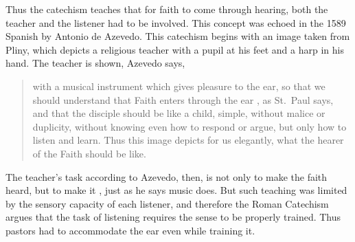 Thus the catechism teaches that for faith to come through hearing, both the 
teacher and the listener had to be involved.
This concept was echoed in the 1589 Spanish  by Antonio de Azevedo.%
  \Autocite{Azevedo:Catecismo}
This catechism begins with an image taken from Pliny, which depicts a religious 
teacher with a pupil at his feet and a harp in his hand.
The teacher is shown, Azevedo says,
\begin{quote}
    with a musical instrument which gives pleasure to the ear, so that we 
    should understand that Faith enters through the ear , as 
    St.\ Paul says, and that the disciple should be like a child, simple, without 
    malice or duplicity, without knowing even how to respond or argue, but only how 
    to listen and learn.
    Thus this image depicts for us elegantly, what the hearer of the Faith 
    should be like.%
        \Autocite
        [f.~1b: 
        ]
        {Azevedo:Catecismo}
\end{quote}

The teacher's task according to Azevedo, then, is not only to make the faith 
heard, but to make it , just as he says music does.
But such teaching was limited by the sensory capacity of each listener, and 
therefore the Roman Catechism argues that the task of listening requires the 
sense to be properly trained.
Thus pastors had to accommodate the ear even while training it.

